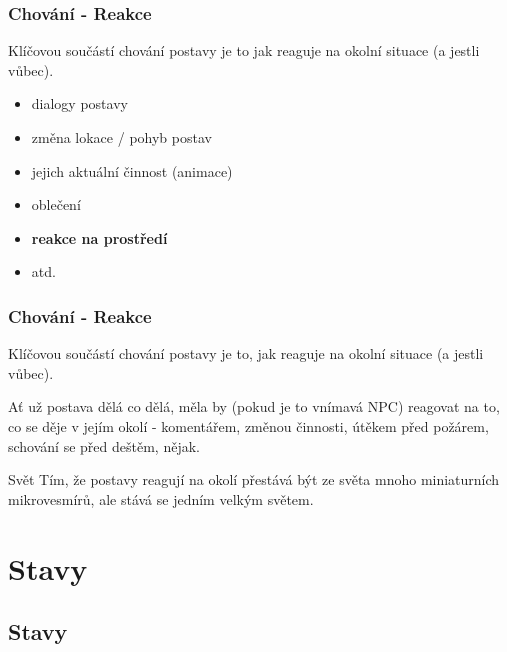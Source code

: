 ﻿\documentclass[a4paper]{beamer}
\begin{document}
\begin{frame}
\frametitle{Chování - Reakce}

Klíčovou součástí chování postavy je to jak reaguje na okolní situace (a jestli vůbec).
 \vfill

  \begin{itemize} 
      \item dialogy postavy
      \item změna lokace / pohyb postav
      \item jejich aktuální činnost (animace)
      \item oblečení
      \item \textbf{reakce na prostředí}
      \item atd.
  \end{itemize}
\end{frame}


\begin{frame}
\frametitle{Chování - Reakce}

Klíčovou součástí chování postavy je to, jak reaguje na okolní situace (a jestli vůbec).
 \vfill

Ať už postava dělá co dělá, měla by (pokud je to vnímavá NPC) reagovat na to, co se děje v jejím okolí - komentářem, změnou činnosti, útěkem před požárem, schování se před deštěm, nějak. 

\vfill
\begin{exampleblock}{Svět}
Tím, že postavy reagují na okolí přestává být ze světa mnoho miniaturních mikrovesmírů, ale stává se jedním velkým světem. 
\end{exampleblock} 
\vfill

\end{frame}

\section{Stavy}
\subsection*{Stavy}
\end{document}
